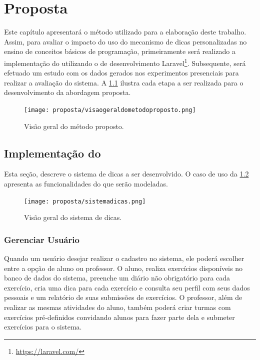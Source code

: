 \chapter{Proposta}

Este capítulo apresentará o método utilizado para a elaboração deste trabalho. Assim, para avaliar o impacto do uso do mecanismo de dicas personalizadas no ensino de conceitos básicos de programação, primeiramente será realizado a implementação do  utilizando o  de desenvolvimento Laravel\footnote{\url{https://laravel.com/}}. Subsequente, será efetuado um estudo com os dados gerados nos experimentos presenciais para realizar a avaliação do sistema. A \cref{figura:visaometodo} ilustra cada etapa a ser realizada para o desenvolvimento da abordagem proposta.

\begin{figure}[h]
	\captionsetup{justification=centering}
	\texttt{[image: proposta/visaogeraldometodoproposto.png]}
	\caption{Visão geral do método proposto.}
	\label{figura:visaometodo}
\end{figure}

\section{Implementação do }

Esta seção, descreve o sistema de dicas a ser desenvolvido. O caso de uso da \cref{figura:sistemadicas} apresenta as funcionalidades do  que serão modeladas.

\begin{figure}[h]
	\centering
	\captionsetup{justification=centering}
	\texttt{[image: proposta/sistemadicas.png]}
	\caption{Visão geral do sistema de dicas.}
	\label{figura:sistemadicas}
\end{figure}

\subsection{Gerenciar Usuário}

Quando um usuário desejar realizar o cadastro no sistema, ele poderá escolher entre a opção de aluno ou professor. O aluno, realiza exercícios disponíveis no banco de dados do sistema, preenche um diário não obrigatório para cada exercício, cria uma dica para cada exercício e consulta seu perfil com seus dados pessoais e um relatório de suas submissões de exercícios. O professor, além de realizar as mesmas atividades do aluno, também poderá criar turmas com exercícios pré-definidos convidando alunos para fazer parte dela e submeter exercícios para o sistema. 

